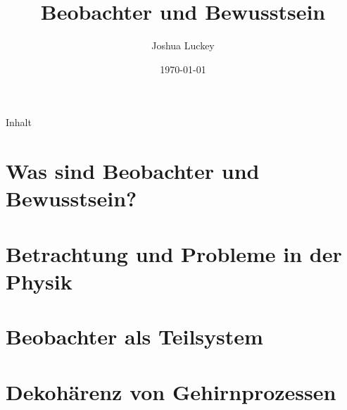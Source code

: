 
\newcommand{\Quote}[1]{\enquote{\emph{#1}}}
\newcommand{\altemph}[2]{\alt<#2>{\bfseries#1}{#1}}

\linespread{1.1}


\makeatletter
\def\beamer@framenotesbegin{%
	\gdef\beamer@noteitems{}%
	\gdef\beamer@notes{{}}%
}
\makeatother



\title{Beobachter und Bewusstsein}
\date{\today}
\author{Joshua Luckey}


	
	\maketitle
	
	
	\begin{frame}{Inhalt}
		\tableofcontents%
	\end{frame}
	
	
	\section{Was sind Beobachter und Bewusstsein?}
		\separatorslide
		
		
	
	\section{Betrachtung und Probleme in der Physik}
		\separatorslide
		
		
		
	\section{Beobachter als Teilsystem}
		\separatorslide
		
		
		
		
		
		
	\section{Dekohärenz von Gehirnprozessen}
		\separatorslide
		
		
				
